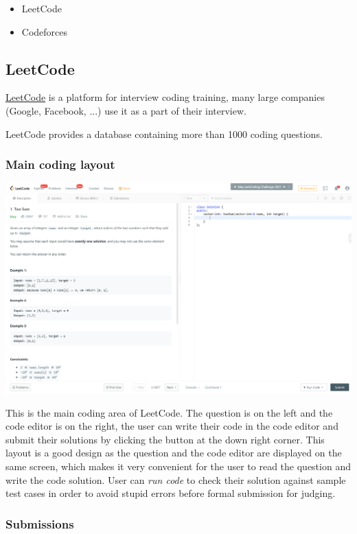 \documentclass{report}
\begin{document}
\begin{itemize}
    \item LeetCode
    \item Codeforces
\end{itemize}

\subsection{LeetCode}

\href{https://leetcode.com/}{LeetCode} is a platform for interview coding training, many large companies (Google, Facebook, ...) use it as a part of their interview.

LeetCode provides a database containing more than 1000 coding questions.

\subsubsection{Main coding layout}
\includegraphics[width=\linewidth]{Two-Sum-LeetCode-Coding}

This is the main coding area of LeetCode. The question is on the left and the code editor is on the right, the user can write their code in the code editor and submit their solutions by clicking the button at the down right corner. This layout is a good design as the question and the code editor are displayed on the same screen, which makes it very convenient for the user to read the question and write the code solution. User can \emph{run code} to check their solution against sample test cases in order to avoid stupid errors before formal submission for judging.

\subsubsection{Submissions}
\end{document}
